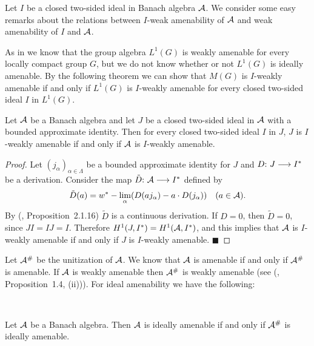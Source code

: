 \documentclass[fleqn]{mat01}
\begin{document}
Let $I$ be a closed two-sided ideal in Banach algebra $\cal A$. We
consider some easy remarks about the relations between $I$-weak
amenability of $\cal A$ and weak amenability of $I$ and $\cal A$. 

As in \cite{Jo2} we know that the group algebra $L^1(G)$ is weakly
amenable for every locally compact group $G$, but we do not know whether
or not $L^1(G)$ is ideally amenable. By the following theorem we can
show that $M(G)$ is $I$-weakly amenable if and only if $L^1(G)$ is
$I$-weakly amenable for every closed two-sided ideal $I$ in $L^1(G)$.

\begin{theor}[\!]
Let $\cal A$ be a Banach algebra and let $J$ be a closed two-sided ideal
in $\cal A$ with a bounded approximate identity. Then for every closed
two-sided ideal $I$ in $J${\rm ,} $J$ is $I$-weakly amenable if and only if
$\cal A$ is $I$-weakly amenable.
\end{theor}

\begin{proof}
Let $(j_\alpha)_{\alpha\in \Lambda}$ be a bounded approximate identity
for $J$ and $D\hbox{:}\ J \longrightarrow I^*$ be a derivation. Consider
the map $\tilde D\hbox{:}\ {\cal A}\longrightarrow I^*$ defined by
\begin{equation*}
\tilde D(a)=w^*-\lim_\alpha (D(aj_\alpha)-a\cdot D(j_\alpha))\quad (a\in
\cal A).
\end{equation*}
By (\cite{Ru}, Proposition~2.1.16) $\tilde D$ is a continuous
derivation. If $D=0$, then $\tilde D=0$, since $JI=IJ=I$. Therefore
$H^1(J,I^*)=H^1({\cal A},I^*)$, and this implies that $\cal A$ is
$I$-weakly amenable if and only if $J$ is $I$-weakly amenable.\hfill
$\blacksquare$
\end{proof}

Let ${\cal A}^{\#} $ be the unitization of ${\cal A}$. We know that
${\cal A}$ is amenable if and only if ${\cal A}^{\#}$ is amenable. If
${\cal A}$ is weakly amenable then ${\cal A}^{\#}$ is weakly amenable
(see (\cite{D-Gh-G}, Proposition~1.4, (ii))). For ideal amenability we
have the following:

\begin{propo}$\left.\right.$\vspace{.5pc}

\noindent Let ${\cal A}$ be a Banach algebra. Then ${\cal A}$ is ideally
amenable if and only if ${\cal A}^{\#}$ is ideally amenable.
\end{propo}
\end{document}
